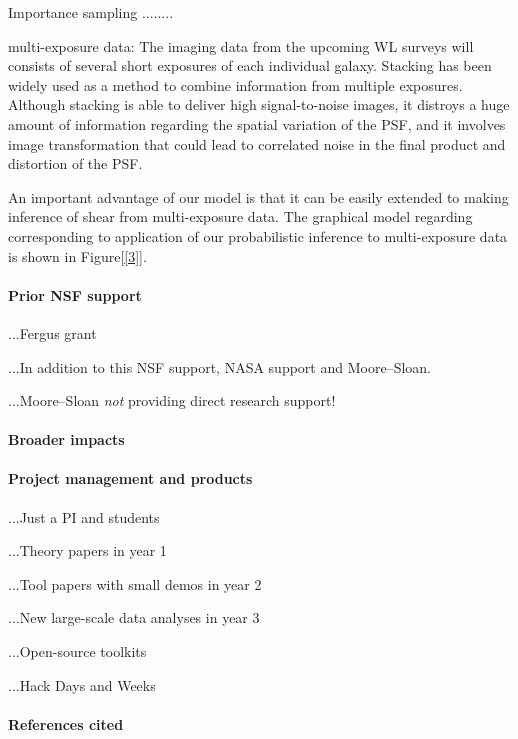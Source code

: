 \documentclass[12pt]{article}
\begin{document}
Importance sampling ........

multi-exposure data:
The imaging data from the upcoming WL surveys will consists of several
short exposures of each individual galaxy. Stacking has been widely used
as a method to combine information from multiple exposures. 
Although stacking is able to deliver high signal-to-noise images, it distroys a
huge amount of information regarding the spatial variation of
the PSF, and it involves image transformation that could lead to correlated noise
in the final product and distortion of the PSF.

An important advantage of our model is that it can be easily extended
to making inference of shear from multi-exposure data. The graphical model 
regarding corresponding to application of our probabilistic inference to
multi-exposure data is shown in Figure[\ref{3}].

\paragraph{Prior NSF support}

...Fergus grant

...In addition to this NSF support, NASA support and Moore--Sloan.

...Moore--Sloan \emph{not} providing direct research support!

\paragraph{Broader impacts}

\paragraph{Project management and products}

...Just a PI and students

...Theory papers in year 1

...Tool papers with small demos in year 2

...New large-scale data analyses in year 3

...Open-source toolkits

...Hack Days and Weeks

\paragraph{References cited}

\clearpage
\end{document}
